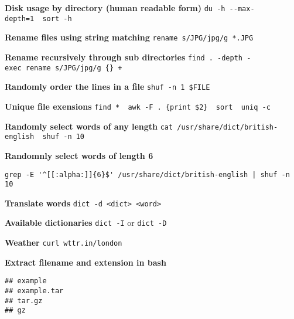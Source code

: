 \documentclass[]{book}
\newenvironment{Shaded}{\begin{snugshade}}{\end{snugshade}}
\newcommand{\StringTok}[1]{\textcolor[rgb]{0.31,0.60,0.02}{#1}}
\newcommand{\VariableTok}[1]{\textcolor[rgb]{0.00,0.00,0.00}{#1}}
\newcommand{\BuiltInTok}[1]{#1}
\newcommand{\NormalTok}[1]{#1}
\theoremstyle{definition}
\theoremstyle{definition}
\theoremstyle{definition}
\theoremstyle{remark}
\begin{document}
\textbf{Disk usage by directory (human readable form)}
\texttt{du\ -h\ -\/-max-depth=1\ \textbar{}\ sort\ -h}

\textbf{Rename files using string matching}
\texttt{rename\ \textquotesingle{}s/JPG/jpg/g\textquotesingle{}\ *.JPG}

\textbf{Rename recursively through sub directories}
\texttt{find\ .\ -depth\ -exec\ rename\ \textquotesingle{}s/JPG/jpg/g\textquotesingle{}\ \{\}\ +}

\textbf{Randomly order the lines in a file} \texttt{shuf\ -n\ 1\ \$FILE}

\textbf{Unique file exensions}
\texttt{find\ *\ \textbar{}\ awk\ -F\ .\ \{\textquotesingle{}print\ \$2\textquotesingle{}\}\ \textbar{}\ sort\ \textbar{}\ uniq\ -c}

\textbf{Randomly select words of any length}
\texttt{cat\ /usr/share/dict/british-english\ \textbar{}\ shuf\ -n\ 10}

\textbf{Randomnly select words of length 6}

\begin{verbatim}
grep -E '^[[:alpha:]]{6}$' /usr/share/dict/british-english | shuf -n 10
\end{verbatim}

\textbf{Translate words}
\texttt{dict\ -d\ \textless{}dict\textgreater{}\ \textless{}word\textgreater{}}

\textbf{Available dictionaries} \texttt{dict\ -I} or \texttt{dict\ -D}

\textbf{Weather} \texttt{curl\ wttr.in/london}

\textbf{Extract filename and extension in bash}

\begin{Shaded}
\end{Shaded}

\begin{verbatim}
## example
## example.tar
## tar.gz
## gz
\end{verbatim}
\end{document}
